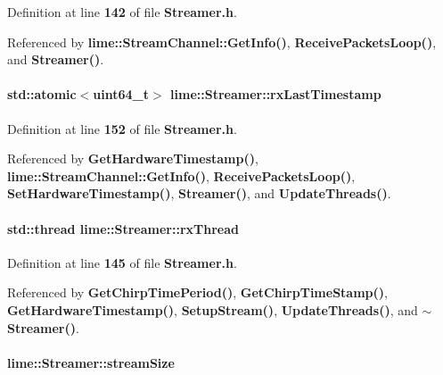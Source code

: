 Definition at line {\bf 142} of file {\bf Streamer.\+h}.



Referenced by {\bf lime\+::\+Stream\+Channel\+::\+Get\+Info()}, {\bf Receive\+Packets\+Loop()}, and {\bf Streamer()}.

\paragraph[{rx\+Last\+Timestamp}]{\setlength{\rightskip}{0pt plus 5cm}std\+::atomic$<$uint64\+\_\+t$>$ lime\+::\+Streamer\+::rx\+Last\+Timestamp}\label{classlime_1_1Streamer_a63dbdc66ed33bb6f503605d9c1f66924}


Definition at line {\bf 152} of file {\bf Streamer.\+h}.



Referenced by {\bf Get\+Hardware\+Timestamp()}, {\bf lime\+::\+Stream\+Channel\+::\+Get\+Info()}, {\bf Receive\+Packets\+Loop()}, {\bf Set\+Hardware\+Timestamp()}, {\bf Streamer()}, and {\bf Update\+Threads()}.

\paragraph[{rx\+Thread}]{\setlength{\rightskip}{0pt plus 5cm}std\+::thread lime\+::\+Streamer\+::rx\+Thread}\label{classlime_1_1Streamer_a7417e97c63b56482c2730b6df05a6526}


Definition at line {\bf 145} of file {\bf Streamer.\+h}.



Referenced by {\bf Get\+Chirp\+Time\+Period()}, {\bf Get\+Chirp\+Time\+Stamp()}, {\bf Get\+Hardware\+Timestamp()}, {\bf Setup\+Stream()}, {\bf Update\+Threads()}, and {\bf $\sim$\+Streamer()}.

\paragraph[{stream\+Size}]{ lime\+::\+Streamer\+::stream\+Size}\label{classlime_1_1Streamer_a09f4d312f6ee5f04494455fe2fe7b482}



